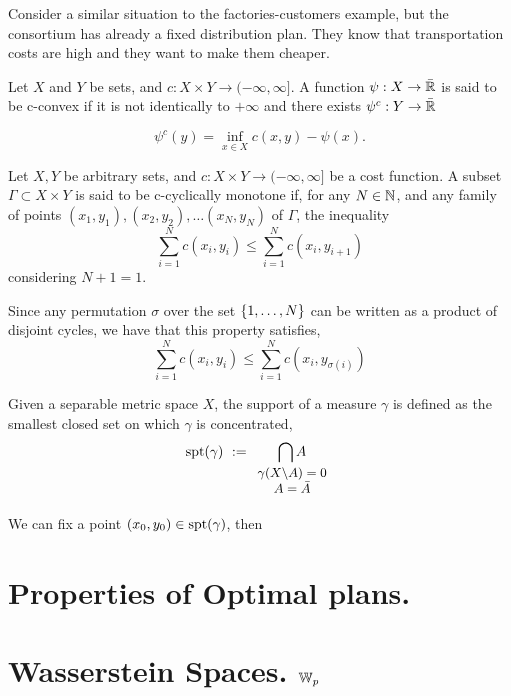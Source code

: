 Consider a similar situation to the factories-customers example, but the consortium has already a fixed distribution plan. They know that transportation costs are high and they want to make them cheaper. 

\begin{definition}[c-transform]
	Let $X$ and $Y$ be sets, and $c:X\times Y \rightarrow (-\infty, \infty]$. A function $\psi: X\rightarrow \bar{\mathbb{R}}$ is said to be c-convex if it is not identically to $+\infty$ and there exists $\psi^c: Y \rightarrow \bar{\mathbb{R}}$
	
	\begin{equation}
		\psi^c(y)= \inf_{x\in X} c(x,y)-\psi(x).
	\end{equation}
\end{definition}

\begin{definition}
	Let $X , Y$ be arbitrary sets, and $c:X\times Y \rightarrow (-\infty, \infty]$ be a cost function. A subset $\Gamma \subset X \times Y$ is said to be c-cyclically monotone if, for any $N\in\mathbb{N}$, and any family of points $(x_1, y_1), (x_2, y_2), \dots (x_N, y_N)$ of $\Gamma$, the inequality
	\begin{equation*}
		\sum_{i=1}^{N} c(x_i, y_i) \leq \sum_{i=1}^{N} c(x_i, y_{i+1}) 
	\end{equation*} 
	considering $N+1=1$. 
\end{definition}
Since any permutation $\sigma$ over the set $\left\lbrace 1, \dots, N \right\rbrace$ can be written as a product of disjoint cycles, we have that this property satisfies,
\begin{equation}
		\sum_{i=1}^{N} c(x_i, y_i) \leq \sum_{i=1}^{N} c(x_i, y_{\sigma(i)}) 
\end{equation}
\begin{definition}
	Given a separable metric space $X$, the support of a measure $\gamma$ is defined as the smallest closed set on which $\gamma$ is concentrated,
	\begin{equation}
	\spt(\gamma)\ :=\underset{\small{\begin{array}{c}
		\gamma(X\backslash A)=0\\ A=\bar{A}  \end{array}}}{\bigcap A} 		
	\end{equation} 
\end{definition}
We can fix a point $(x_0, y_0) \in \mathrm{spt}(\gamma)$, then 
\begin{theorem}
	
\end{theorem}

\section{Properties of Optimal plans.}
\section{Wasserstein Spaces. $\mathbb{W}_{p}$}